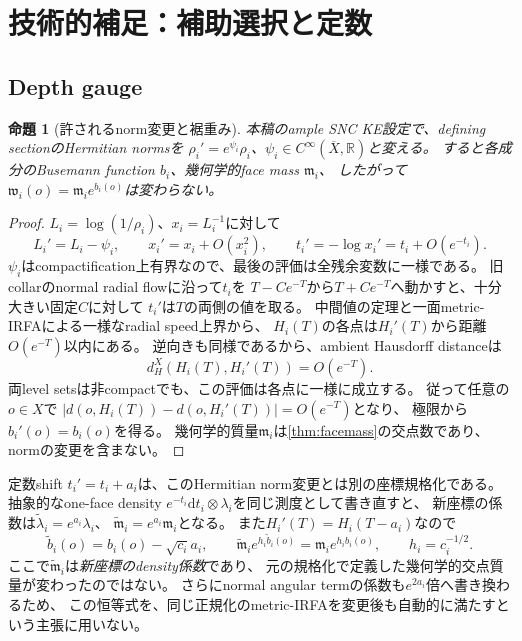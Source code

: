 \documentclass[11pt,a4paper]{ltjsarticle}
\newcommand{\RR}{\mathbb R}
\newcommand{\dd}{\mathrm d}
\newcommand{\ov}{\overline}
\theoremstyle{plain}
\newtheorem{proposition}[proposition]{命題}
\theoremstyle{definition}
\theoremstyle{remark}
\begin{document}
\appendix
\section{技術的補足：補助選択と定数}
\label{app:choices}

\subsection{Depth gauge}
\begin{proposition}[許されるnorm変更と裾重み]
\label{prop:depth-gauge}
本稿のample SNC KE設定で、defining sectionのHermitian normsを
$\rho_i'=e^{\psi_i}\rho_i$、$\psi_i\in C^\infty(\ov X,\RR)$と変える。
すると各成分のBusemann function $b_i$、幾何学的face mass $\mathfrak m_i$、
したがって$\mathfrak w_i(o)=\mathfrak m_i e^{b_i(o)}$は変わらない。
\end{proposition}
\begin{proof}
$L_i=\log(1/\rho_i)$、$x_i=L_i^{-1}$に対して
\[
 L_i'=L_i-\psi_i,\qquad
 x_i'=x_i+O(x_i^2),
 \qquad
 t_i'=-\log x_i'=t_i+O(e^{-t_i}).
\]
$\psi_i$はcompactification上有界なので、最後の評価は全残余変数に一様である。
旧collarのnormal radial flowに沿って$t_i$を
$T-Ce^{-T}$から$T+Ce^{-T}$へ動かすと、十分大きい固定$C$に対して
$t_i'$は$T$の両側の値を取る。
中間値の定理と一面metric-IRFAによる一様なradial speed上界から、
$H_i(T)$の各点は$H_i'(T)$から距離$O(e^{-T})$以内にある。
逆向きも同様であるから、ambient Hausdorff distanceは
\[
 d_H^X(H_i(T),H_i'(T))=O(e^{-T}).
\]
両level setsは非compactでも、この評価は各点に一様に成立する。
従って任意の$o\in X$で
$|d(o,H_i(T))-d(o,H_i'(T))|=O(e^{-T})$となり、
極限から$b_i'(o)=b_i(o)$を得る。
幾何学的質量$\mathfrak m_i$は\cref{thm:facemass}の交点数であり、
normの変更を含まない。
\end{proof}

定数shift $t_i'=t_i+a_i$は、このHermitian norm変更とは別の座標規格化である。
抽象的なone-face density $e^{-t_i}\dd t_i\otimes\lambda_i$を同じ測度として書き直すと、
新座標の係数は$\widetilde\lambda_i=e^{a_i}\lambda_i$、
$\widetilde{\mathfrak m}_i=e^{a_i}\mathfrak m_i$となる。
また$H_i'(T)=H_i(T-a_i)$なので
\[
 \widetilde b_i(o)=b_i(o)-\sqrt{c_i}a_i,\qquad
 \widetilde{\mathfrak m}_i e^{h_i\widetilde b_i(o)}
 =\mathfrak m_i e^{h_i b_i(o)},\qquad h_i=c_i^{-1/2}.
\]
ここで$\widetilde{\mathfrak m}_i$は\emph{新座標のdensity係数}であり、
元の規格化で定義した幾何学的交点質量が変わったのではない。
さらにnormal angular termの係数も$e^{2a_i}$倍へ書き換わるため、
この恒等式を、同じ正規化のmetric-IRFAを変更後も自動的に満たすという主張に用いない。
\end{document}
